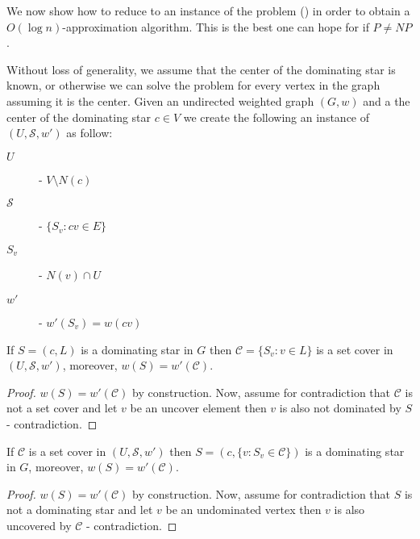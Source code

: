 We now show how to reduce \ProbStar{} to an instance of the \ProblemSetCover{} problem
(\ProbSetCover{}) in order to obtain a $O(\log n)$-approximation algorithm.
This is the best one can hope for if $P \neq NP$.

Without loss of generality, we assume that the center of the dominating star is known,
or otherwise we can solve the problem for every vertex in the graph assuming it is 
the center.  
Given an undirected weighted graph $(G, w)$ and a the center of the dominating star
$c \in V$ we create the following an instance of \ProbSetCover{} 
$(U, \mathcal{S}, w')$ as follow:
\begin{description}
\item[$U$] - $V \setminus N(c)$
\item[$\mathcal{S}$] - $\{S_v : cv \in E\}$
\item[$S_v$] - $N(v) \cap U$
\item[$w'$] - $w'(S_v) = w(cv)$ 
\end{description}


\begin{claim}
If $S = (c, L)$ is a dominating star in $G$ then 
$\mathcal{C} = \{S_v : v \in L\}$ is a set cover in $(U, \mathcal{S}, w')$,
moreover, $w(S) = w'(\mathcal{C})$.  
\end{claim}

\begin{proof}
$w(S) = w'(\mathcal{C})$ by construction.
Now, assume for contradiction that $\mathcal{C}$ is not a set cover and let $v$
be an uncover element then $v$ is also not dominated by $S$ - contradiction.
\end{proof}

\begin{claim}
If $\mathcal{C}$ is a set cover in $(U, \mathcal{S}, w')$ 
then $S = (c, \{v : S_v \in \mathcal{C}\})$ is a dominating star in $G$,
moreover, $w(S) = w'(\mathcal{C})$.  
\end{claim}

\begin{proof}
$w(S) = w'(\mathcal{C})$ by construction.
Now, assume for contradiction that $S$ is not a dominating star and let $v$
be an undominated vertex then $v$ is also uncovered by $\mathcal{C}$ - contradiction.
\end{proof}